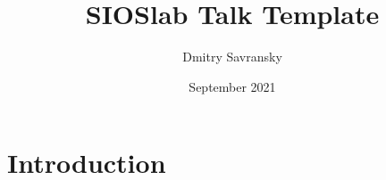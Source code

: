 \documentclass{article}
\title{SIOSlab Talk Template}
\author{Dmitry Savransky}
\date{September 2021}
\begin{document}
\maketitle

\section{Introduction}
\end{document}

